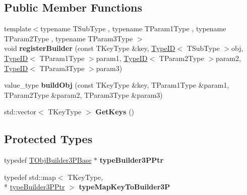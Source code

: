 \subsection*{Public Member Functions}
\begin{DoxyCompactItemize}
\item 
\hypertarget{class_t_obj_factory3_p_aab66ad808b556c7472476258c81e53ef}{{\footnotesize template$<$typename T\+Sub\+Type , typename T\+Param1\+Type , typename T\+Param2\+Type , typename T\+Param3\+Type $>$ }\\void {\bfseries register\+Builder} (const T\+Key\+Type \&key, \hyperlink{class_type_i_d}{Type\+I\+D}$<$ T\+Sub\+Type $>$obj, \hyperlink{class_type_i_d}{Type\+I\+D}$<$ T\+Param1\+Type $>$param1, \hyperlink{class_type_i_d}{Type\+I\+D}$<$ T\+Param2\+Type $>$param2, \hyperlink{class_type_i_d}{Type\+I\+D}$<$ T\+Param3\+Type $>$param3)}\label{class_t_obj_factory3_p_aab66ad808b556c7472476258c81e53ef}

\item 
\hypertarget{class_t_obj_factory3_p_aacde9284b74eb6d2875894172db7bd91}{value\+\_\+type {\bfseries build\+Obj} (const T\+Key\+Type \&key, T\+Param1\+Type \&param1, T\+Param2\+Type \&param2, T\+Param3\+Type \&param3)}\label{class_t_obj_factory3_p_aacde9284b74eb6d2875894172db7bd91}

\item 
\hypertarget{class_t_obj_factory3_p_a86cbafd616035b6dd9e1eb8a626913da}{std\+::vector$<$ T\+Key\+Type $>$ {\bfseries Get\+Keys} ()}\label{class_t_obj_factory3_p_a86cbafd616035b6dd9e1eb8a626913da}

\end{DoxyCompactItemize}
\subsection*{Protected Types}
\begin{DoxyCompactItemize}
\item 
\hypertarget{class_t_obj_factory3_p_a7b88de944f63a3a544c5b93ee034e06c}{typedef \hyperlink{class_t_obj_factory3_p_1_1_t_obj_builder3_p_base}{T\+Obj\+Builder3\+P\+Base} $\ast$ {\bfseries type\+Builder3\+P\+Ptr}}\label{class_t_obj_factory3_p_a7b88de944f63a3a544c5b93ee034e06c}

\item 
\hypertarget{class_t_obj_factory3_p_a1d6f5225333265019d37ddb56db94b2e}{typedef std\+::map$<$ T\+Key\+Type, \\*
\hyperlink{class_t_obj_factory3_p_1_1_t_obj_builder3_p_base}{type\+Builder3\+P\+Ptr} $>$ {\bfseries type\+Map\+Key\+To\+Builder3\+P}}\label{class_t_obj_factory3_p_a1d6f5225333265019d37ddb56db94b2e}

\end{DoxyCompactItemize}
